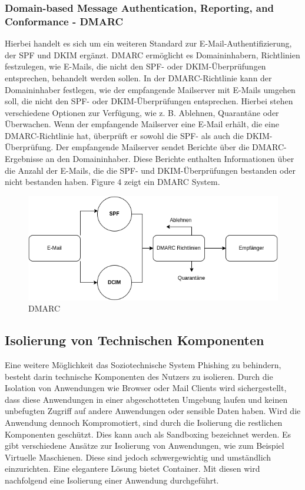 \documentclass[journal=tosc,final]{iacrtrans}
\begin{document}
 \subsubsection{Domain-based Message Authentication, Reporting, and Conformance - DMARC}
 Hierbei handelt es sich um ein weiteren Standard zur E-Mail-Authentifizierung, der SPF und DKIM ergänzt. DMARC ermöglicht es Domaininhabern, Richtlinien festzulegen, wie E-Mails, die nicht den SPF- oder DKIM-Überprüfungen entsprechen, behandelt werden sollen. In der DMARC-Richtlinie kann der Domaininhaber festlegen, wie der empfangende Mailserver mit E-Mails umgehen soll, die nicht den SPF- oder DKIM-Überprüfungen entsprechen. Hierbei stehen verschiedene Optionen zur Verfügung, wie z. B. Ablehnen, Quarantäne oder Überwachen. Wenn der empfangende Mailserver eine E-Mail erhält, die eine DMARC-Richtlinie hat, überprüft er sowohl die SPF- als auch die DKIM-Überprüfung. Der empfangende Mailserver sendet Berichte über die DMARC-Ergebnisse an den Domaininhaber. Diese Berichte enthalten Informationen über die Anzahl der E-Mails, die die SPF- und DKIM-Überprüfungen bestanden oder nicht bestanden haben. Figure 4 zeigt ein DMARC System.
 \begin{figure}[h]
  \caption{DMARC}
  \centering \includegraphics[scale=0.5]{dmarc.png}
 \end{figure}
\newpage
\subsection{Isolierung von Technischen Komponenten}
Eine weitere Möglichkeit das Soziotechnische System Phishing zu behindern, besteht darin technische Komponenten des Nutzers zu isolieren. Durch die Isolation von Anwendungen wie Browser oder Mail Clients wird sichergestellt, dass diese Anwendungen in einer abgeschotteten Umgebung laufen und keinen unbefugten Zugriff auf andere Anwendungen oder sensible Daten haben. Wird die Anwendung dennoch Kompromotiert, sind durch die Isolierung die restlichen Komponenten geschützt. Dies kann auch als Sandboxing bezeichnet werden. Es gibt verschiedene Ansätze zur Isolierung von Anwendungen, wie zum Beispiel Virtuelle Maschienen. Diese sind jedoch schwergewichtig und umständlich einzurichten. Eine elegantere Lösung bietet Container. Mit diesen wird nachfolgend eine Isolierung einer Anwendung durchgeführt. 
\end{document}
